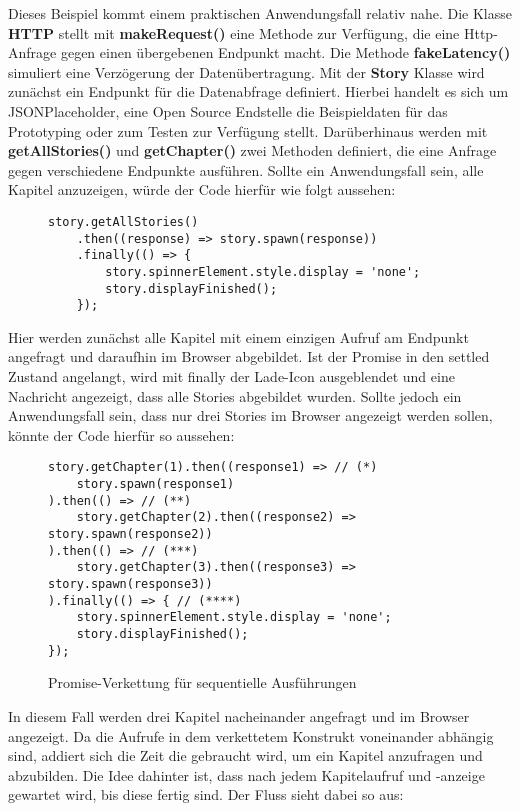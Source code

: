 \noindent
Dieses Beispiel kommt einem praktischen Anwendungsfall relativ nahe. Die Klasse \textbf{HTTP} stellt mit  \textbf{makeRequest()} eine Methode zur Verfügung, die eine Http-Anfrage gegen einen übergebenen Endpunkt macht. Die Methode \textbf{fakeLatency()} simuliert eine Verzögerung der Datenübertragung. Mit der \textbf{Story} Klasse wird zunächst ein Endpunkt für die Datenabfrage definiert. Hierbei handelt es sich um JSONPlaceholder, eine Open Source Endstelle die Beispieldaten für das Prototyping oder zum Testen zur Verfügung stellt. Darüberhinaus werden mit \textbf{getAllStories()} und \textbf{getChapter()} zwei Methoden definiert, die eine Anfrage gegen verschiedene Endpunkte ausführen. Sollte ein Anwendungsfall sein, alle Kapitel anzuzeigen, würde der Code hierfür wie folgt aussehen:

\begin{figure}[H]
\begin{lstlisting}[basicstyle=\small]
story.getAllStories()
    .then((response) => story.spawn(response))
    .finally(() => {
        story.spinnerElement.style.display = 'none';
        story.displayFinished();
    });
\end{lstlisting}
\end{figure}

\noindent
Hier werden zunächst alle Kapitel mit einem einzigen Aufruf am Endpunkt angefragt und daraufhin im Browser abgebildet. Ist der Promise in den settled Zustand angelangt, wird mit finally der Lade-Icon ausgeblendet und eine Nachricht angezeigt, dass alle Stories abgebildet wurden. Sollte jedoch ein Anwendungsfall sein, dass nur drei Stories im Browser angezeigt werden sollen, könnte der Code hierfür so aussehen: 

\begin{figure}[H]
\begin{lstlisting}[basicstyle=\small]
story.getChapter(1).then((response1) => // (*)
    story.spawn(response1)
).then(() => // (**)
    story.getChapter(2).then((response2) => story.spawn(response2))
).then(() => // (***)
    story.getChapter(3).then((response3) => story.spawn(response3))
).finally(() => { // (****)
    story.spinnerElement.style.display = 'none';
    story.displayFinished();
});
\end{lstlisting}
\caption{Promise-Verkettung für sequentielle Ausführungen}
\end{figure}

\noindent
In diesem Fall werden drei Kapitel nacheinander angefragt und im Browser angezeigt. Da die Aufrufe in dem verkettetem Konstrukt voneinander abhängig sind, addiert sich die Zeit die gebraucht wird, um ein Kapitel anzufragen und abzubilden. Die Idee dahinter ist, dass nach jedem Kapitelaufruf und -anzeige gewartet wird, bis diese fertig sind. Der Fluss sieht dabei so aus:

